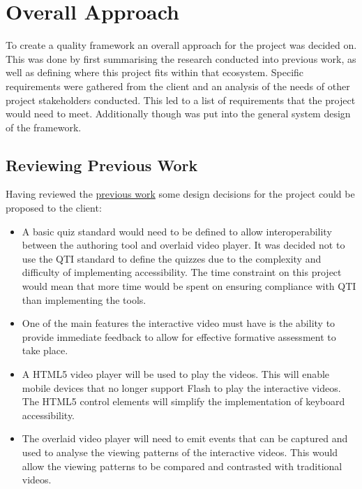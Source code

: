 \chapter{Overall Approach} 
\label{Chapter:Overall Approach}

\begin{preamble}
	To create a quality framework an overall approach for the project was decided on. \\ This was done by first summarising the research conducted into previous work, as well as defining where this project fits within that ecosystem. Specific requirements were gathered from the client and an analysis of the needs of other project stakeholders conducted. This led to a list of requirements that the project would need to meet. Additionally though was put into the general system design of the framework.
\end{preamble}

\section{Reviewing Previous Work}
Having reviewed the \href{Chapter:Previous Work}{previous work} some design decisions for the project could be proposed to the client:
\begin{itemize}
\item A basic quiz standard would need to be defined to allow interoperability between the authoring tool and overlaid video player. It was decided not to use the \gls{QTI} standard to define the quizzes due to the complexity and difficulty of implementing accessibility. The time constraint on this project would mean that more time would be spent on ensuring compliance with \gls{QTI} than implementing the tools.
\item One of the main features the interactive video must have is the ability to provide immediate feedback to allow for effective formative assessment to take place.  \item A HTML5 video player will be used to play the videos. This will enable mobile devices that no longer support Flash to play the interactive videos. The HTML5 control elements will simplify the implementation of keyboard accessibility.
\item The overlaid video player will need to emit events that can be captured and used to analyse the viewing patterns of the interactive videos. This would allow the viewing patterns to be compared and contrasted with traditional videos.
\end{itemize}
